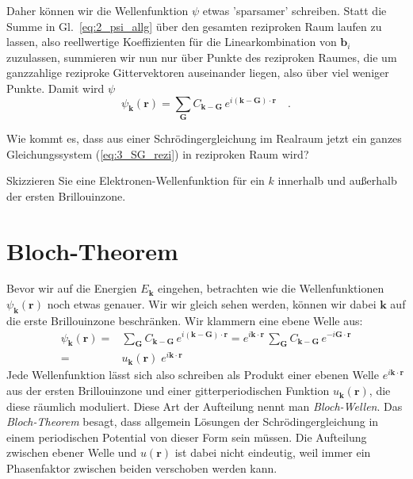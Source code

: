 Daher können wir die  Wellenfunktion $\psi$ etwas 'sparsamer' schreiben. Statt die Summe in  Gl.~\ref{eq:2_psi_allg} über den gesamten reziproken Raum laufen zu lassen, also reellwertige Koeffizienten für die Linearkombination von $\mathbf{b}_i$ zuzulassen, summieren wir nun nur über Punkte des reziproken Raumes, die um ganzzahlige reziproke Gittervektoren auseinander liegen, also über viel weniger Punkte. Damit wird $\psi$
\begin{equation}
    \psi_\mathbf{k}(\mathbf{r}) =  \sum_{\mathbf{G}} C_{\mathbf{k}-\mathbf{G}} \, e^{i (\mathbf{k}- \mathbf{G}) \cdot \mathbf{r} }  \quad .
\end{equation}


\begin{questions}
    \item Wie kommt es, dass aus einer Schrödingergleichung im Realraum jetzt ein ganzes Gleichungssystem (\ref{eq:3_SG_rezi}) in reziproken Raum wird?
    \item Skizzieren Sie eine Elektronen-Wellenfunktion für ein $k$ innerhalb und außerhalb der ersten Brillouinzone.
\end{questions}


\section{Bloch-Theorem}


Bevor wir auf die Energien $E_\mathbf{k}$ eingehen, betrachten wie die Wellenfunktionen $ \psi_\mathbf{k}(\mathbf{r})$ noch etwas genauer. Wir wir gleich sehen werden, können wir dabei $\mathbf{k}$ auf die erste Brillouinzone beschränken. 
Wir klammern eine ebene Welle aus:
\begin{eqnarray}
    \psi_\mathbf{k}(\mathbf{r}) = & \sum_{\mathbf{G}} C_{\mathbf{k}-\mathbf{G}} \, e^{i (\mathbf{k}- \mathbf{G}) \cdot \mathbf{r} }
    = e^{i \mathbf{k} \cdot \mathbf{r} } \,
    \sum_{\mathbf{G}} C_{\mathbf{k}-\mathbf{G}} \, e^{-i \mathbf{G} \cdot \mathbf{r} } \\
    = & u_\mathbf{k}(\mathbf{r}) \; e^{i \mathbf{k} \cdot \mathbf{r} } 
\end{eqnarray}
Jede Wellenfunktion lässt sich also schreiben als Produkt einer ebenen Welle $e^{i \mathbf{k} \cdot \mathbf{r} }$ aus der ersten Brillouinzone und einer gitterperiodischen Funktion $u_\mathbf{k}(\mathbf{r})$, die diese räumlich moduliert. Diese Art der Aufteilung nennt man \emph{Bloch-Wellen}. Das \emph{Bloch-Theorem} besagt, dass allgemein Lösungen der Schrödingergleichung in einem periodischen Potential von dieser Form sein müssen. Die Aufteilung zwischen ebener Welle und $u(\mathbf{r})$ ist dabei nicht eindeutig, weil immer ein Phasenfaktor zwischen beiden verschoben werden kann.

